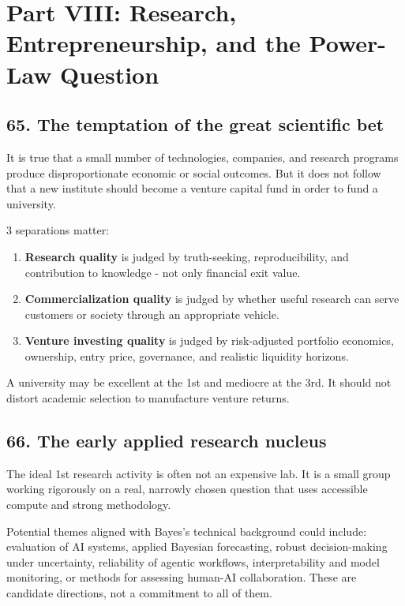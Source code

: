 
\section*{Part VIII: Research, Entrepreneurship, and the Power-Law Question}

\subsection{65. The temptation of the great scientific bet}

It is true that a small number of technologies, companies, and research programs produce disproportionate economic or social outcomes. But it does not follow that a new institute should become a venture capital fund in order to fund a university.

3 separations matter:

\begin{enumerate}[leftmargin=*,itemsep=1.5pt]
  \item \textbf{Research quality} is judged by truth-seeking, reproducibility, and contribution to knowledge - not only financial exit value.
  \item \textbf{Commercialization quality} is judged by whether useful research can serve customers or society through an appropriate vehicle.
  \item \textbf{Venture investing quality} is judged by risk-adjusted portfolio economics, ownership, entry price, governance, and realistic liquidity horizons.
\end{enumerate}

A university may be excellent at the 1st and mediocre at the 3rd. It should not distort academic selection to manufacture venture returns.

\subsection{66. The early applied research nucleus}

The ideal 1st research activity is often not an expensive lab. It is a small group working rigorously on a real, narrowly chosen question that uses accessible compute and strong methodology.

Potential themes aligned with Bayes's technical background could include: evaluation of AI systems, applied Bayesian forecasting, robust decision-making under uncertainty, reliability of agentic workflows, interpretability and model monitoring, or methods for assessing human-AI collaboration. These are candidate directions, not a commitment to all of them.


